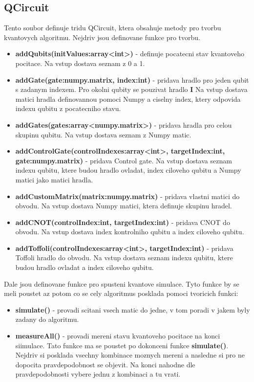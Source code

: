 \documentclass[11pt]{article}
\begin{document}
\subsection{QCircuit}
Tento soubor definuje tridu QCircuit, ktera obsahuje metody pro tvorbu kvantovych algoritmu.
Nejdriv jsou definovane funkce pro tvorbu.
\begin{itemize}
    \item \textbf{addQubits(initValues:array<int>)} - definuje pocatecni stav kvantoveho pocitace.
          Na vstup dostava seznam z 0 a 1.
    \item \textbf{addGate(gate:numpy.matrix, index:int)} - pridava hradlo pro jeden qubit s zadanym indexem.
          Pro okolni qubity se pouzivat hradlo \textbf{I}
          Na vstup dostava matici hradla definovannou pomoci Numpy a ciselny index, ktery odpovida indexu qubitu z pocatecniho stavu.
    \item \textbf{addGates(gates:array<numpy.matrix>)} - pridava hradla pro celou skupinu qubitu.
          Na vstup dostava seznam z Numpy matic.
    \item \textbf{addControlGate(controlIndexes:array<int>, targetIndex:int, gate:numpy.matrix)} - pridava Control gate.
          Na vstup dostava seznam indexu qubitu, ktere budou hradlo ovladat, index ciloveho qubitu a Numpy matici jako matici hradla.
    \item \textbf{addCustomMatrix(matrix:numpy.matrix)} - pridava vlastni matici do obvodu.
          Na vstup dostava Numpy matici, ktera definuje skupinu hradel.
    \item \textbf{addCNOT(controlIndex:int, targetIndex:int)} - pridava CNOT do obvodu.
          Na vstup dostava index kontrolniho qubitu a index ciloveho qubitu.
    \item \textbf{addToffoli(controlIndexes:array<int>, targetIndex:int)} - pridava Toffoli hradlo do obvodu.
          Na vstup dostava seznam indexu qubitu, ktere budou hradlo ovladat a index ciloveho qubitu.
\end{itemize}
\par Dale jsou definovane funkce pro spusteni kvantove simulace.
Tyto funkce by se meli poustet az potom co se cely algoritmus posklada pomoci tvoricich funkci:
\begin{itemize}
    \item \textbf{simulate()} - provadi scitani vsech matic do jedne, v tom poradi v jakem byly zadany do algoritmu.
    \item \textbf{measureAll()} - provadi mereni stavu kvantoveho pocitace na konci siimulace.
          Tato funkce ma se poustet po dokonceni funkce \textbf{simulate()}.
          Nejdriv si posklada vsechny kombinace moznych mereni a nasledne si pro ne dopocita pravdepodobnost se objevit.
          Na konci nahodne dle pravdepodobnosti vybere jednu z kombinaci a tu vrati.
\end{itemize}
\end{document}
